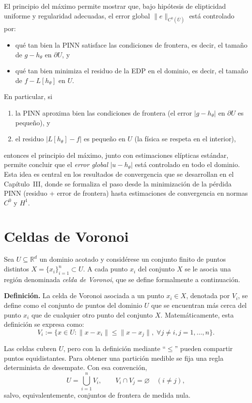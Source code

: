 El principio del máximo permite mostrar que, bajo hipótesis de elipticidad uniforme y regularidad adecuadas, el error global $\|e\|_{C^0(\overline{U})}$ está controlado por:
\begin{itemize}
  \item qué tan bien la PINN satisface las condiciones de frontera, es decir, el tamaño de $g-h_\theta$ en $\partial U$, y
  \item qué tan bien minimiza el residuo de la EDP en el dominio, es decir, el tamaño de $f - L[h_\theta]$ en $U$.
\end{itemize}
En particular, si
\begin{enumerate}
  \item la PINN aproxima bien las condiciones de frontera (el error $|g-h_\theta|$ en $\partial U$ es pequeño), y
  \item el residuo $|L[h_\theta] - f|$ es pequeño en $U$ (la física se respeta en el interior),
\end{enumerate}
entonces el principio del máximo, junto con estimaciones elípticas estándar, permite concluir que el \emph{error global} $|u - h_\theta|$ está controlado en todo el dominio. Esta idea es central en los resultados de convergencia que se desarrollan en el Capítulo~III, donde se formaliza el paso desde la minimización de la pérdida PINN (residuo + error de frontera) hasta estimaciones de convergencia en normas $C^0$ y $H^1$.


\section{Celdas de Voronoi}

Sea \( U \subseteq \mathbb{R}^d \) un dominio acotado y considérese un conjunto finito de puntos distintos \( X = \{ x_i \}_{i=1}^{n} \subset U \). A cada punto \( x_i \) del conjunto \( X \) se le asocia una región denominada \emph{celda de Voronoi}, que se define formalmente a continuación.

\textbf{Definición.} La celda de Voronoi asociada a un punto \( x_i \in X \), denotada por \( V_i \), se define como el conjunto de puntos del dominio \( U \) que se encuentran más cerca del punto \( x_i \) que de cualquier otro punto del conjunto \( X \). Matemáticamente, esta definición se expresa como:
\[
V_i := \{ x \in U : \| x - x_i \| \leq \| x - x_j \|, \; \forall j \neq i, j=1,\dots,n \}.
\]

Las celdas cubren $U$, pero con la definición mediante ``$\leq$'' pueden compartir puntos equidistantes. Para obtener una partición medible se fija una regla determinista de desempate. Con esa convención,
\[
U=\bigcup_{i=1}^{n}V_i,
\qquad
V_i\cap V_j=\varnothing\quad(i\neq j),
\]
salvo, equivalentemente, conjuntos de frontera de medida nula.

